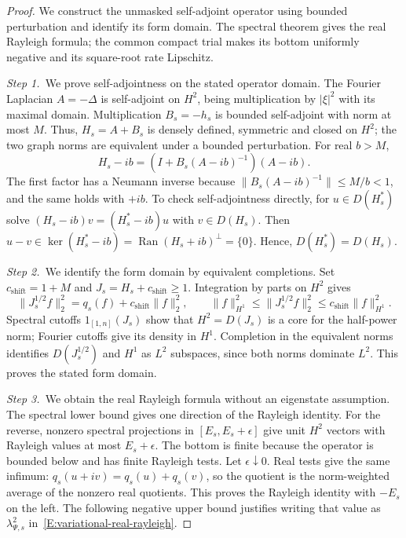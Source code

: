 \begin{proof}
  We construct the unmasked self-adjoint operator using bounded perturbation
  and identify its form domain. The spectral theorem gives the real Rayleigh
  formula; the common compact trial makes its bottom uniformly negative and
  its square-root rate Lipschitz.


  \medskip
  \noindent\textit{Step 1.~}We prove self-adjointness on the stated operator
  domain.
  The Fourier Laplacian $A = -\Delta$ is self-adjoint on $H^2$, being
  multiplication by $|\xi|^2$ with its maximal domain. Multiplication $B_s =
  -h_s$ is bounded self-adjoint with norm at most $M$. Thus, $H_s = A+B_s$ is
  densely defined, symmetric and closed on $H^2$; the two graph norms are
  equivalent under a bounded perturbation. For real $b > M$,
  \[
    H_s-ib=(I+B_s(A-ib)^{-1})(A-ib).
  \]
  The first factor has a Neumann inverse because $\|B_s(A-ib)^{-1}\| \le M/b <
  1$, and the same holds with $+ib$. To check self-adjointness directly, for $u
  \in D(H_s^*)$ solve $(H_s-ib)v = (H_s^*-ib)u$ with $v \in D(H_s)$. Then $u-v
  \in \ker(H_s^*-ib) = \operatorname{Ran}(H_s+ib)^\perp = \{0\}$. Hence,
  $D(H_s^*) = D(H_s)$.


  \medskip
  \noindent\textit{Step 2.~}We identify the form domain by equivalent
  completions.
  Set $c_{\mathrm{shift}} = 1+M$ and $J_s = H_s+c_{\mathrm{shift}} \ge 1$.
  Integration by parts on $H^2$ gives
  \[
    \|J_s^{1/2}f\|_2^2=q_s(f)+c_{\mathrm{shift}}\|f\|_2^2,\qquad
    \|f\|_{H^1}^2\le\|J_s^{1/2}f\|_2^2
    \le c_{\mathrm{shift}}\|f\|_{H^1}^2.
  \]
  Spectral cutoffs $1_{[1,n]}(J_s)$ show that $H^2 = D(J_s)$ is a core for the
  half-power norm; Fourier cutoffs give its density in $H^1$. Completion in the
  equivalent norms identifies $D(J_s^{1/2})$ and $H^1$ as $L^2$ subspaces, since
  both norms dominate $L^2$. This proves the stated form domain.


  \medskip
  \noindent\textit{Step 3.~}We obtain the real Rayleigh formula without an
  eigenstate assumption.
  The spectral lower bound gives one direction of the Rayleigh identity. For the
  reverse, nonzero spectral projections in $[E_s,E_s+\epsilon]$ give unit $H^2$
  vectors with Rayleigh values at most $E_s+\epsilon$. The bottom is finite
  because the operator is bounded below and has finite Rayleigh tests. Let
  $\epsilon\downarrow0$. Real tests give the same infimum: $q_s(u+iv) =
  q_s(u)+q_s(v)$, so the quotient is the norm-weighted average of the nonzero
  real quotients. This proves the Rayleigh identity with $-E_s$ on the left. The
  following negative upper bound justifies writing that value as
  $\lambda_{\Psi,s}^2$ in~\eqref{E:variational-real-rayleigh}.


\end{proof}
